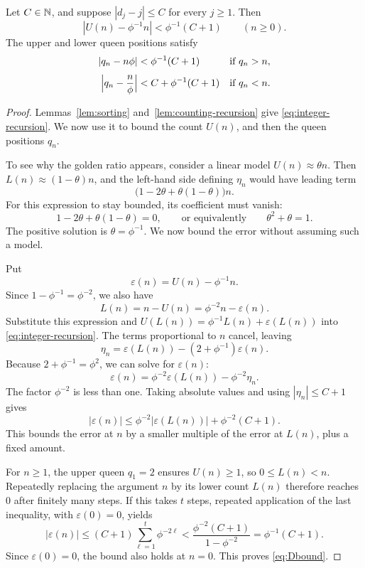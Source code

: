 \begin{proposition}\label{prop:stability}
Let $C\in\mathbb N$, and suppose $|d_j-j|\le C$ for every $j\ge1$. Then
\begin{equation}\label{eq:Dbound}
 |U(n)-\phi^{-1}n|<\phi^{-1}(C+1)\qquad(n\ge0).
\end{equation}
The upper and lower queen positions satisfy
\[
 \begin{aligned}
 |q_n-n\phi|&<\phi^{-1}(C+1)&&\text{if }q_n>n,\\[3pt]
 \Bigl|q_n-\frac{n}{\phi}\Bigr|&<C+\phi^{-1}(C+1)&&\text{if }q_n<n.
 \end{aligned}
\]
\end{proposition}
\begin{proof}
Lemmas~\ref{lem:sorting} and~\ref{lem:counting-recursion} give
\eqref{eq:integer-recursion}. We now use it to bound the count $U(n)$, 
and then the queen positions $q_n$.

To see why the golden ratio appears, consider a linear model
$U(n)\approx\theta n$. Then $L(n)\approx(1-\theta)n$, and the left-hand
side defining $\eta_n$ would have leading term
\[
 \bigl(1-2\theta+\theta(1-\theta)\bigr)n.
\]
For this expression to stay bounded, its coefficient must vanish:
\[
 1-2\theta+\theta(1-\theta)=0,
 \qquad\text{or equivalently}\qquad \theta^2+\theta=1.
\]
The positive solution is $\theta=\phi^{-1}$. We now bound the error
without assuming such a model.

Put
\[
 \varepsilon(n)=U(n)-\phi^{-1}n.
\]
Since $1-\phi^{-1}=\phi^{-2}$, we also have
\[
 L(n)=n-U(n)=\phi^{-2}n-\varepsilon(n).
\]
Substitute this expression and
$U(L(n))=\phi^{-1}L(n)+\varepsilon(L(n))$ into
\eqref{eq:integer-recursion}. The terms proportional to $n$ cancel,
leaving
\[
 \eta_n=\varepsilon(L(n))-(2+\phi^{-1})\varepsilon(n).
\]
Because $2+\phi^{-1}=\phi^2$, we can solve for $\varepsilon(n)$:
\begin{equation}\label{eq:contraction}
 \varepsilon(n)=\phi^{-2}\varepsilon(L(n))-\phi^{-2}\eta_n.
\end{equation}
The factor $\phi^{-2}$ is less than one. Taking absolute values and using
$|\eta_n|\le C+1$ gives
\[
 |\varepsilon(n)|\le\phi^{-2}|\varepsilon(L(n))|+\phi^{-2}(C+1).
\]
This bounds the error at $n$ by a smaller multiple of the error at
$L(n)$, plus a fixed amount.

For $n\ge1$, the upper queen $q_1=2$ ensures $U(n)\ge1$, so
$0\le L(n)<n$. Repeatedly replacing the argument $n$ by its lower count $L(n)$
therefore reaches $0$ after finitely many steps. If this takes $t$
steps, repeated application of the last inequality, with $\varepsilon(0)=0$,
yields
\[
 |\varepsilon(n)|\le(C+1)\sum_{\ell=1}^{t}\phi^{-2\ell}
 <\frac{\phi^{-2}(C+1)}{1-\phi^{-2}}=\phi^{-1}(C+1).
\]
Since $\varepsilon(0)=0$, the bound also holds at $n=0$.
This proves \eqref{eq:Dbound}.


\end{proof}
